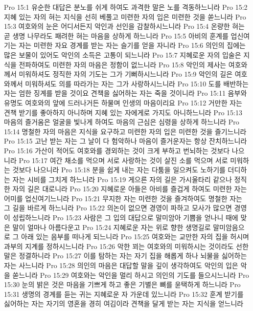 Pro 15:1  유순한 대답은 분노를 쉬게 하여도 과격한 말은 노를 격동하느니라
Pro 15:2  지혜 있는 자의 혀는 지식을 선히 베풀고 미련한 자의 입은 미련한 것을 쏟느니라
Pro 15:3  여호와의 눈은 어디서든지 악인과 선인을 감찰하시느니라
Pro 15:4  온량한 혀는 곧 생명 나무라도 패려한 혀는 마음을 상하게 하느니라
Pro 15:5  아비의 훈계를 업신여기는 자는 미련한 자요 경계를 받는 자는 슬기를 얻을 자니라
Pro 15:6  의인의 집에는 많은 보물이 있어도 악인의 소득은 고통이 되느니라
Pro 15:7  지혜로운 자의 입술은 지식을 전파하여도 미련한 자의 마음은 정함이 없느니라
Pro 15:8  악인의 제사는 여호와께서 미워하셔도 정직한 자의 기도는 그가 기뻐하시느니라
Pro 15:9  악인의 길은 여호와께서 미워하셔도 의를 따라가는 자는 그가 사랑하시느니라
Pro 15:10  도를 배반하는 자는 엄한 징계를 받을 것이요 견책을 싫어하는 자는 죽을 것이니라
Pro 15:11  음부와 유명도 여호와의 앞에 드러나거든 하물며 인생의 마음이리요
Pro 15:12  거만한 자는 견책 받기를 좋아하지 아니하며 지혜 있는 자에게로 가지도 아니하느니라
Pro 15:13  마음의 즐거움은 얼굴을 빛나게 하여도 마음의 근심은 심령을 상하게 하느니라
Pro 15:14  명철한 자의 마음은 지식을 요구하고 미련한 자의 입은 미련한 것을 즐기느니라
Pro 15:15  고난 받는 자는 그 날이 다 험악하나 마음이 즐거운자는 항상 잔치하느니라
Pro 15:16  가산이 적어도 여호와를 경외하는 것이 크게 부하고 번뇌하는 것보다 나으니라
Pro 15:17  여간 채소를 먹으며 서로 사랑하는 것이 살진 소를 먹으며 서로 미워하는 것보다 나으니라
Pro 15:18  분을 쉽게 내는 자는 다툼을 일으켜도 노하기를 더디하는 자는 시비를 그치게 하느니라
Pro 15:19  게으른 자의 길은 가시울타리 같으나 정직한 자의 길은 대로니라
Pro 15:20  지혜로운 아들은 아비를 즐겁게 하여도 미련한 자는 어미를 업신여기느니라
Pro 15:21  무지한 자는 미련한 것을 즐겨하여도 명철한 자는 그 길을 바르게 하느니라
Pro 15:22  의논이 없으면 경영이 파하고 모사가 많으면 경영이 성립하느니라
Pro 15:23  사람은 그 입의 대답으로 말미암아 기쁨을 얻나니 때에 맞은 말이 얼마나 아름다운고
Pro 15:24  지혜로운 자는 위로 향한 생명길로 말미암음으로 그 아래 있는 음부를 떠나게 되느니라
Pro 15:25  여호와는 교만한 자의 집을 허시며 과부의 지계를 정하시느니라
Pro 15:26  악한 꾀는 여호와의 미워하시는 것이라도 선한 말은 정결하니라
Pro 15:27  이를 탐하는 자는 자기 집을 해롭게 하나 뇌물을 싫어하는 자는 사느니라
Pro 15:28  의인의 마음은 대답할 말을 깊이 생각하여도 악인의 입은 악을 쏟느니라
Pro 15:29  여호와는 악인을 멀리 하시고 의인의 기도를 들으시느니라
Pro 15:30  눈의 밝은 것은 마음을 기쁘게 하고 좋은 기별은 뼈를 윤택하게 하느니라
Pro 15:31  생명의 경계를 듣는 귀는 지혜로운 자 가운데 있느니라
Pro 15:32  훈계 받기를 싫어하는 자는 자기의 영혼을 경히 여김이라 견책을 달게 받는 자는 지식을 얻느니라
